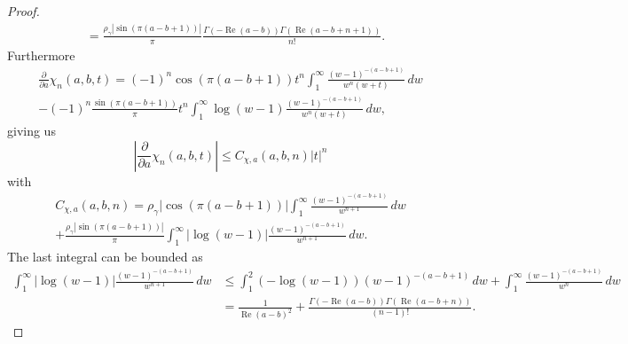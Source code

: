 \documentclass[11pt]{article}
\DeclareMathOperator{\real}{Re}
\begin{document}
\begin{proof}
\begin{align*}
    &= \frac{\rho_{\gamma}|\sin(\pi(a - b + 1))|}{\pi}
      \frac{\Gamma(-\real(a - b))\Gamma(\real(a - b + n + 1))}{n!}.
  \end{align*}
  Furthermore
  \begin{multline*}
    \frac{\partial}{\partial a}\chi_{n}(a, b, t)
    = (-1)^{n}\cos(\pi(a - b + 1))t^{n}
    \int_{1}^{\infty} \frac{(w - 1)^{-(a - b + 1)}}{w^{n}(w + t)}\,dw\\
    - (-1)^{n}\frac{\sin(\pi(a - b + 1))}{\pi}t^{n}
    \int_{1}^{\infty} \log(w - 1)\frac{(w - 1)^{-(a - b + 1)}}{w^{n}(w + t)}\,dw,
  \end{multline*}
  giving us
  \begin{equation*}
    \left|\frac{\partial}{\partial a}\chi_{n}(a, b, t)\right|
    \leq C_{\chi,a}(a, b, n)|t|^{n}
  \end{equation*}
  with
  \begin{multline*}
    C_{\chi,a}(a, b, n) = \rho_{\gamma}|\cos(\pi(a - b + 1))|
    \int_{1}^{\infty} \frac{(w - 1)^{-(a - b + 1)}}{w^{n + 1}}\,dw\\
    + \frac{\rho_{\gamma}|\sin(\pi(a - b + 1))|}{\pi}
    \int_{1}^{\infty} |\log(w - 1)|\frac{(w - 1)^{-(a - b + 1)}}{w^{n + 1}}\,dw.
  \end{multline*}
  The last integral can be bounded as
  \begin{align*}
    \int_{1}^{\infty} |\log(w - 1)|\frac{(w - 1)^{-(a - b + 1)}}{w^{n + 1}}\,dw
    &\leq \int_{1}^{2} (-\log(w - 1))(w - 1)^{-(a - b + 1)}\,dw
      + \int_{1}^{\infty} \frac{(w - 1)^{-(a - b + 1)}}{w^{n}}\,dw\\
    &= \frac{1}{\real(a - b)^{2}}
      + \frac{\Gamma(-\real(a - b))\Gamma(\real(a - b + n))}{(n - 1)!}.
  \end{align*}


\end{proof}
\end{document}
